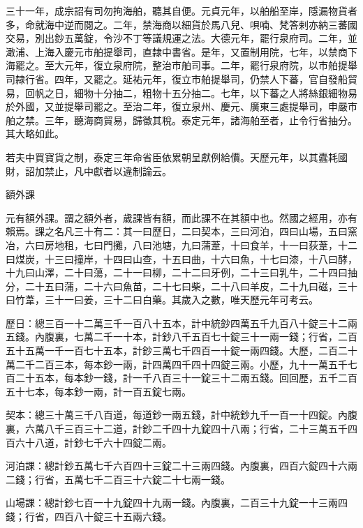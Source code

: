 \begin{pinyinscope}
 三十一年，成宗詔有司勿拘海舶，聽其自便。元貞元年，以舶船至岸，隱漏物貨者多，命就海中逆而閱之。二年，禁海商以細貨於馬八兒、唄喃、梵答剌亦納三蕃國交易，別出鈔五萬錠，令沙不丁等議規運之法。大德元年，罷行泉府司。二年，並澉浦、上海入慶元市舶提舉司，直隸中書省。是年，又置制用院，七年，以禁商下海罷之。至大元年，復立泉府院，整治市舶司事。二年，罷行泉府院，以市舶提舉司隸行省。四年，又罷之。延祐元年，復立市舶提舉司，仍禁人下蕃，官自發船貿易，回帆之日，細物十分抽二，粗物十五分抽二。七年，以下蕃之人將絲銀細物易於外國，又並提舉司罷之。至治二年，復立泉州、慶元、廣東三處提舉司，申嚴市舶之禁。三年，聽海商貿易，歸徵其稅。泰定元年，諸海舶至者，止令行省抽分。其大略如此。



 若夫中買寶貨之制，泰定三年命省臣依累朝呈獻例給價。天歷元年，以其蠹耗國財，詔加禁止，凡中獻者以違制論云。



 額外課



 元有額外課。謂之額外者，歲課皆有額，而此課不在其額中也。然國之經用，亦有賴焉。課之名凡三十有二：其一曰歷日，二曰契本，三曰河泊，四曰山場，五曰窯冶，六曰房地租，七曰門攤，八曰池塘，九曰蒲葦，十曰食羊，十一曰荻葦，十二曰煤炭，十三曰撞岸，十四曰山查，十五曰曲，十六曰魚，十七曰漆，十八曰酵，十九曰山澤，二十曰蕩，二十一曰柳，二十二曰牙例，二十三曰乳牛，二十四曰抽分，二十五曰蒲，二十六曰魚苗，二十七曰柴，二十八曰羊皮，二十九曰磁，三十曰竹葦，三十一曰姜，三十二曰白藥。其歲入之數，唯天歷元年可考云。



 歷日：總三百一十二萬三千一百八十五本，計中統鈔四萬五千九百八十錠三十二兩五錢。內腹裏，七萬二千一十本，計鈔八千五百七十錠三十一兩一錢；行省，二百五十五萬一千一百七十五本，計鈔三萬七千四百一十錠一兩四錢。大歷，二百二十萬二千二百三本，每本鈔一兩，計四萬四千四十四錠三兩。小歷，九十一萬五千七百二十五本，每本鈔一錢，計一千八百三十一錠三十二兩五錢。回回歷，五千二百五十七本，每本鈔一兩，計一百五錠七兩。



 契本：總三十萬三千八百道，每道鈔一兩五錢，計中統鈔九千一百一十四錠。內腹裏，六萬八千三百三十二道，計鈔二千四十九錠四十八兩；行省，二十三萬五千四百六十八道，計鈔七千六十四錠二兩。



 河泊課：總計鈔五萬七千六百四十三錠二十三兩四錢。內腹裏，四百六錠四十六兩二錢；行省，五萬七千二百三十六錠二十七兩一錢。



 山場課：總計鈔七百一十九錠四十九兩一錢。內腹裏，二百三十九錠一十三兩四錢；行省，四百八十錠三十五兩六錢。




\end{pinyinscope}
